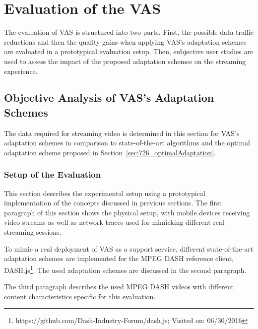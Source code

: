 \section{Evaluation of the VAS}
\label{sec:730_evaluation}
The evaluation of \ac{VAS} is structured into two parts. 
First, the possible data traffic reductions and then the quality gains when applying \ac{VAS}'s adaptation schemes are evaluated in a prototypical evaluation setup. Then, subjective user studies are used to assess the impact of the proposed adaptation schemes on the streaming experience.
\subsection{Objective Analysis of VAS's Adaptation Schemes}
\label{sec:730_evaluation_objective_analysis}
The data required for streaming video is determined in this section for \ac{VAS}'s adaptation schemes in comparison to state-of-the-art algorithms and the optimal adaptation scheme proposed in Section~\ref{sec:726_optimalAdaptation}. 
\subsubsection{Setup of the Evaluation}
\label{sec:730_evaluation_objective_analysis_setup}
This section describes the experimental setup using a prototypical implementation of the concepts discussed in previous sections.
The first paragraph of this section shows the physical setup, with mobile devices receiving video streams as well as network traces used for mimicking different real streaming sessions.

To mimic a real deployment of \ac{VAS} as a support service, different state-of-the-art adaptation schemes are implemented for the \ac{MPEG} \ac{DASH} reference client, DASH.js\footnote{https://github.com/Dash-Industry-Forum/dash.js; Visited on: 06/30/2016}.
The used adaptation schemes are discussed in the second paragraph.

The third paragraph describes the used  \ac{MPEG} \ac{DASH} videos with different content characteristics specific for this evaluation.
